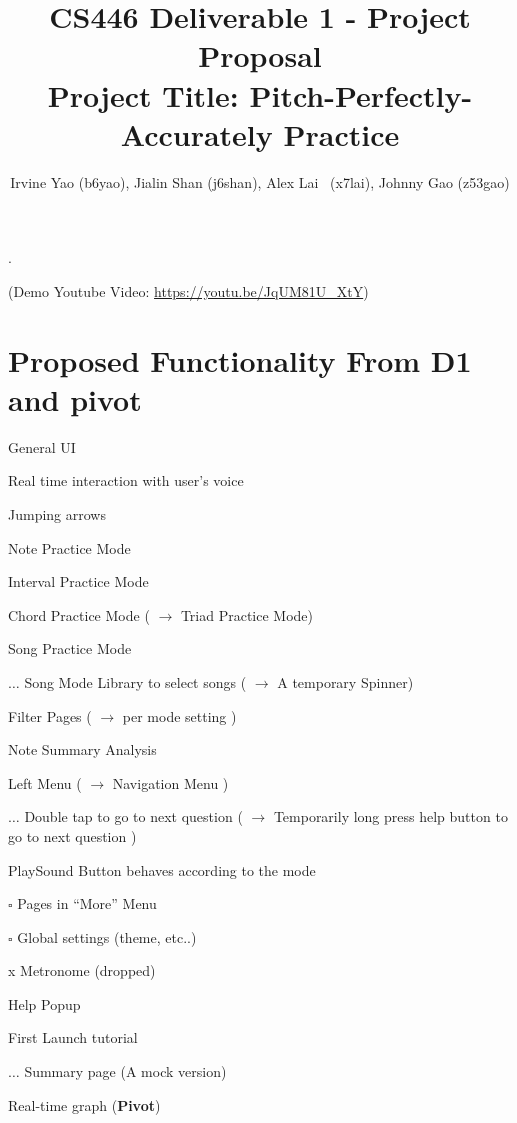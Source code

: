 \documentclass{article}
\title{
CS446 Deliverable 1 - Project Proposal \\
    Project Title: Pitch-Perfectly-Accurately Practice}
\author{Irvine Yao (b6yao), Jialin Shan (j6shan), Alex Lai \ (x7lai), Johnny Gao (z53gao)}
\newcommand{\cmark}{$\checkmark$}%
\newcommand{\done}{\rlap{$\square$}{\raisebox{2pt}{\large\hspace{1pt}\cmark}}%
\newcommand{\notdone}{\rlap{$\square$}{\large\hspace{1pt}\xmark}}\hspace{-2.5pt}}
\begin{document}
\maketitle

.
\begin{center}
(Demo Youtube Video: \url{https://youtu.be/JqUM81U_XtY})
\end{center}
\section{Proposed Functionality From D1 and pivot}
\begin{todolist}
\item [\done] General UI 
\item [\done] Real time interaction with user’s voice
\item [\done] Jumping arrows
\item [\done] Note Practice Mode
\item [\done] Interval Practice Mode
\item [\done] Chord Practice Mode ( $\to$ Triad Practice Mode)
\item [\done] Song Practice Mode 
\item [$\ldots$] Song Mode Library to select songs ( $\to$ A temporary Spinner)
\item [\done] Filter Pages ( $\to$ per mode setting )
\item [\done] Note Summary Analysis
\item [\done] Left Menu ( $\to$ Navigation Menu )
\item [$\ldots$] Double tap to go to next question ( $\to$ Temporarily long press help button to go to next question )
\item [\done] PlaySound Button behaves according to the mode
\item [$\square$] Pages in “More” Menu 
\item [$\square$] Global settings (theme, etc..)
\item [x] Metronome (dropped)
\item [\done] Help Popup
\item [\done] First Launch tutorial 
\item [$\ldots$] Summary page (A mock version)
\item [\done] Real-time graph  (\textbf{Pivot})
\end{todolist}
\end{document}
